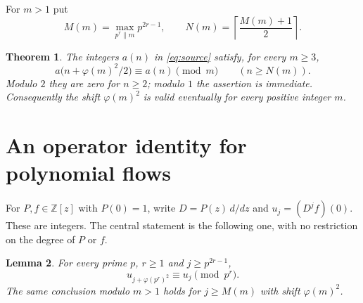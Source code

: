 \documentclass[11pt]{article}
\newtheorem{theorem}{Theorem}
\newtheorem{lemma}[theorem]{Lemma}
\newcommand{\Z}{\mathbb Z}
\newcommand{\ph}{\varphi}
\begin{document}
For $m>1$ put
\begin{equation}\label{eq:bounds}
 M(m)=\max_{p^r\parallel m}p^{2r-1},\qquad
 N(m)=\left\lceil\frac{M(m)+1}{2}\right\rceil.
\end{equation}
\begin{theorem}\label{thm:main}
The integers $a(n)$ in \eqref{eq:source} satisfy, for every $m\ge3$,
\[
 a\bigl(n+\ph(m)^2/2\bigr)\equiv a(n)\pmod m
 \qquad(n\ge N(m)).
\]
Modulo $2$ they are zero for $n\ge2$; modulo $1$ the assertion is
immediate. Consequently the shift $\ph(m)^2$ is valid eventually
for every positive integer $m$.
\end{theorem}

\section{An operator identity for polynomial flows}
For $P,f\in\Z[z]$ with $P(0)=1$, write
$D=P(z)\,d/dz$ and $u_j=(D^jf)(0)$. These are integers.
The central statement is the following one, with no restriction
on the degree of $P$ or $f$.

\begin{lemma}\label{lem:operator}
For every prime $p$, $r\ge1$ and $j\ge p^{2r-1}$,
\begin{equation}\label{eq:operator}
 u_{j+\ph(p^r)^2}\equiv u_j\pmod{p^r}.
\end{equation}
The same conclusion modulo $m>1$ holds for $j\ge M(m)$
with shift $\ph(m)^2$.
\end{lemma}
\end{document}
